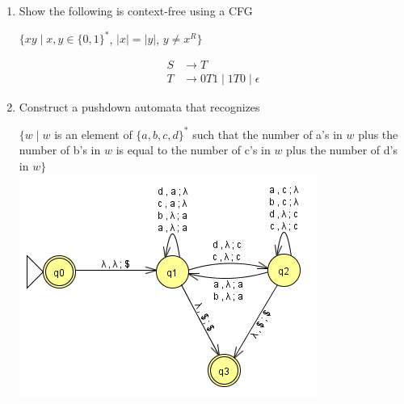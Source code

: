 \documentclass{article}
\begin{document}
\begin{enumerate}
        \item Show the following is context-free using a CFG
            \begin{center}
                $\{xy \mid x,y\in \{0,1\}^*$, $ |x|=|y|$, $ y\not= x^R\}$
            \end{center}
            \begin{align*}
                S&\rightarrow T\\
                T&\rightarrow 0T1 \mid 1T0 \mid \epsilon
            \end{align*}
        \item Construct a pushdown automata that recognizes
            \begin{center}
                $\{w\mid w $ is an element of $\{a,b,c,d\}^* $ such that the number of a's in $w$ plus the number of b's in $w$ is equal to the number 
                of c's in $w$ plus the number of d's in $w \}$\\
                \includegraphics[scale=0.6]{machine2}
            \end{center}
    \end{enumerate}
\end{document}
